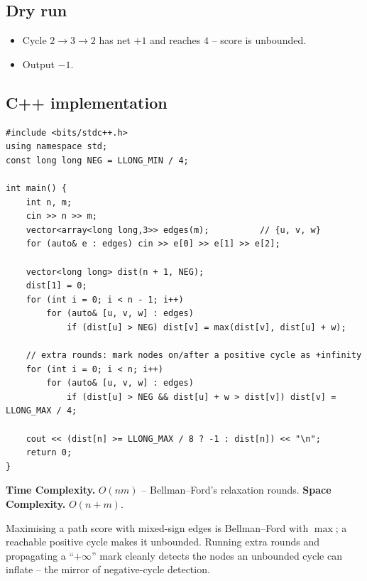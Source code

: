 \subsection*{Dry run}


\begin{itemize}
  \item Cycle $2\!\to\!3\!\to\!2$ has net $+1$ and reaches $4$ -- score is
        unbounded.
  \item Output $-1$.
\end{itemize}

\subsection*{C++ implementation}

\begin{lstlisting}
#include <bits/stdc++.h>
using namespace std;
const long long NEG = LLONG_MIN / 4;

int main() {
    int n, m;
    cin >> n >> m;
    vector<array<long long,3>> edges(m);          // {u, v, w}
    for (auto& e : edges) cin >> e[0] >> e[1] >> e[2];

    vector<long long> dist(n + 1, NEG);
    dist[1] = 0;
    for (int i = 0; i < n - 1; i++)
        for (auto& [u, v, w] : edges)
            if (dist[u] > NEG) dist[v] = max(dist[v], dist[u] + w);

    // extra rounds: mark nodes on/after a positive cycle as +infinity
    for (int i = 0; i < n; i++)
        for (auto& [u, v, w] : edges)
            if (dist[u] > NEG && dist[u] + w > dist[v]) dist[v] = LLONG_MAX / 4;

    cout << (dist[n] >= LLONG_MAX / 8 ? -1 : dist[n]) << "\n";
    return 0;
}
\end{lstlisting}

\begin{complexitybox}
\textbf{Time Complexity.} $O(nm)$ -- Bellman--Ford's relaxation rounds.
\textbf{Space Complexity.} $O(n+m)$.
\end{complexitybox}

\begin{takeawaybox}
Maximising a path score with mixed-sign edges is Bellman--Ford with $\max$;
a reachable positive cycle makes it unbounded. Running extra rounds and
propagating a ``$+\infty$'' mark cleanly detects the nodes an unbounded
cycle can inflate -- the mirror of negative-cycle detection.
\end{takeawaybox}
